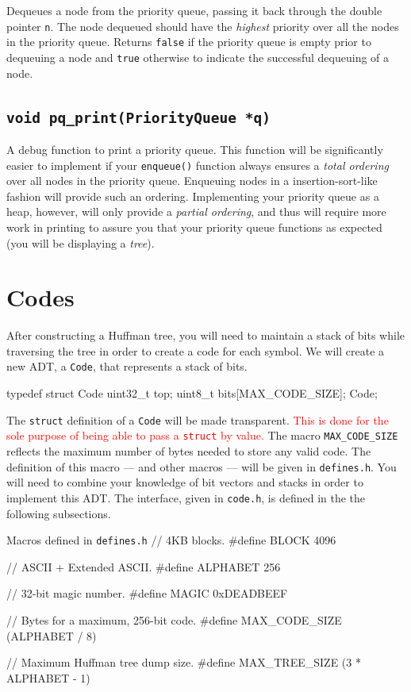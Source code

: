 \documentclass[11pt]{article}
\begin{document}
Dequeues a node from the priority queue, passing it back through the
double pointer \texttt{n}. The node dequeued should have the
\emph{highest} priority over all the nodes in the priority queue.
Returns \texttt{false} if the priority queue is empty prior to
dequeuing a node and \texttt{true} otherwise to indicate the successful
dequeuing of a node.

\subsection{\texttt{void pq\_print(PriorityQueue *q)}}

A debug function to print a priority queue. This function will be
significantly easier to implement if your \texttt{enqueue()} function
always ensures a \emph{total ordering} over all nodes in the priority
queue. Enqueuing nodes in a insertion-sort-like fashion will provide
such an ordering. Implementing your priority queue as a heap, however,
will only provide a \emph{partial ordering}, and thus will require more
work in printing to assure you that your priority queue functions as
expected (you will be displaying a \emph{tree}).

\section{Codes}

After constructing a Huffman tree, you will need to maintain a stack of
bits while traversing the tree in order to create a code for each
symbol. We will create a new ADT, a \texttt{Code}, that represents a
stack of bits.

\begin{codelisting}{}
typedef struct Code {
    uint32_t top;
    uint8_t bits[MAX_CODE_SIZE];
} Code;
\end{codelisting}

The \texttt{struct} definition of a \texttt{Code} will be made
transparent. \textcolor{red}{This is done for the sole purpose of being
able to pass a \texttt{struct} by value.} The macro
\texttt{MAX\_CODE\_SIZE} reflects the maximum number of bytes needed to
store any valid code. The definition of this macro --- and other macros
--- will be given in \texttt{defines.h}. You will need to combine your
knowledge of bit vectors and stacks in order to implement this ADT. The
interface, given in \texttt{code.h}, is defined in the the following
subsections.

\begin{codelisting}{Macros defined in \texttt{defines.h}}
// 4KB blocks.
#define BLOCK 4096

// ASCII + Extended ASCII.
#define ALPHABET 256

// 32-bit magic number.
#define MAGIC 0xDEADBEEF

// Bytes for a maximum, 256-bit code.
#define MAX_CODE_SIZE (ALPHABET / 8)

// Maximum Huffman tree dump size.
#define MAX_TREE_SIZE (3 * ALPHABET - 1)
\end{codelisting}
\end{document}
